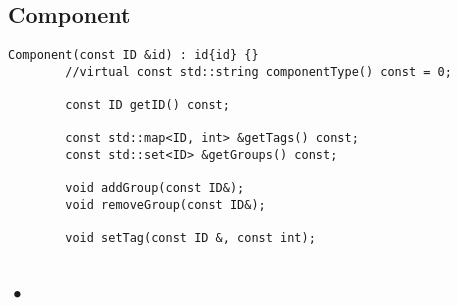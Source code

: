 \subsection{Component}
\begin{verbatim}
Component(const ID &id) : id{id} {}
        //virtual const std::string componentType() const = 0;

        const ID getID() const;

        const std::map<ID, int> &getTags() const;
        const std::set<ID> &getGroups() const;

        void addGroup(const ID&);
        void removeGroup(const ID&);

        void setTag(const ID &, const int);
        \end{verbatim}
        
        
\subsection{•}